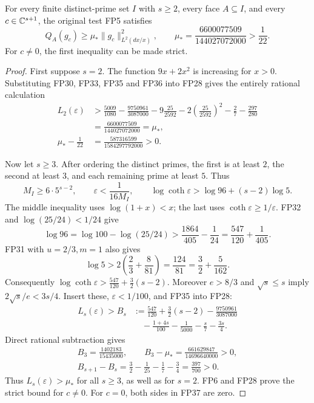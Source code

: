 \begin{theorem}
\label{fp:thm:bound}
For every finite distinct-prime set \(I\) with \(s\ge2\), every
face \(A\subseteq I\), and every \(c\in\mathbb C^{s+1}\), the original
test FP5 satisfies
\[
 Q_A(g_c)\ge\mu_*\|g_c\|_{L^2(dx/x)}^2,\qquad
 \mu_*=\frac{6600077509}{144027072000}>\frac1{22}.
 \tag{FP37}\label{fp:fpb:main}
\]
For \(c\ne0\), the first inequality can be made strict.
\end{theorem}
\begin{proof}
First suppose \(s=2\). The function \(9x+2x^2\) is increasing
for \(x>0\). Substituting FP30, FP33, FP35 and FP36
into FP28 gives the entirely rational calculation
\[
 \begin{aligned}
 L_2(\varepsilon)
 &>\frac{5009}{1080}-\frac{9750961}{3087000}
       -9\frac{25}{2592}
       -2\left(\frac{25}{2592}\right)^2
       -\frac27-\frac{297}{280}\\
 &=\frac{6600077509}{144027072000}=\mu_*,\\
 \mu_*-\frac1{22}
 &=\frac{587316599}{1584297792000}>0 .
 \end{aligned}
 \tag{FP38}\label{fp:fpb:mu-arithmetic}
\]

Now let \(s\ge3\). After ordering the distinct primes, the
first is at least \(2\), the second at least \(3\), and each
remaining prime at least \(5\). Thus
\[
 M_I\ge6\cdot5^{s-2},\qquad
 \varepsilon<\frac1{16M_I},\qquad
 \log\coth\varepsilon>\log96+(s-2)\log5 .
 \tag{FP39}
\]
The middle inequality uses \(\log(1+x)<x\); the last uses
\(\coth\varepsilon\ge1/\varepsilon\).
FP32 and \(\log(25/24)<1/24\) give
\[
 \log96=\log100-\log(25/24)
 >\frac{1864}{405}-\frac1{24}
 =\frac{547}{120}+\frac1{405}.
 \tag{FP40}
\]
FP31 with \(u=2/3,m=1\) also gives
\[
 \log5>2\left(\frac23+\frac8{81}\right)
 =\frac{124}{81}=\frac32+\frac5{162}.
 \tag{FP41}
\]
Consequently
\(\log\coth\varepsilon>\frac{547}{120}+\frac32(s-2)\).
Moreover \(e>8/3\) and \(\sqrt s\le s\) imply
\(2\sqrt s/e<3s/4\).
Insert these, \(\varepsilon<1/100\), and FP35 into FP28:
\[
 \begin{aligned}
 L_s(\varepsilon)>B_s
 &:=
 \frac{547}{120}+\frac32(s-2)-\frac{9750961}{3087000}\\
 &\quad-\frac{1+4s}{100}-\frac1{5000}-\frac s7-\frac{3s}{4}.
 \end{aligned}
 \tag{FP42}
\]
Direct rational subtraction gives
\[
 \begin{gathered}
 B_3=\frac{1402183}{15435000},\qquad
 B_3-\mu_*=\frac{661629847}{14696640000}>0,\\
 B_{s+1}-B_s
   =\frac32-\frac1{25}-\frac17-\frac34
   =\frac{397}{700}>0.
 \end{gathered}
 \tag{FP43}\label{fp:fpb:large-s}
\]
Thus \(L_s(\varepsilon)>\mu_*\) for all \(s\ge3\), as well as for
\(s=2\). FP6 and FP28 prove the strict bound for \(c\ne0\).
For \(c=0\), both sides in FP37 are zero.
\end{proof}

